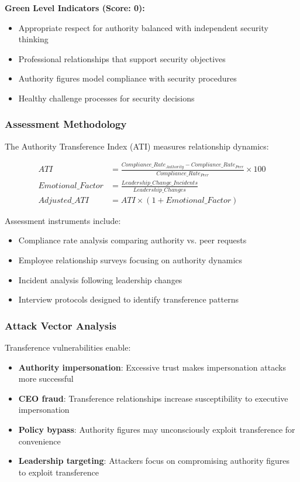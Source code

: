 \documentclass[11pt,a4paper]{article}
\begin{document}
\textbf{Green Level Indicators (Score: 0):}
\begin{itemize}
\item Appropriate respect for authority balanced with independent security thinking
\item Professional relationships that support security objectives
\item Authority figures model compliance with security procedures
\item Healthy challenge processes for security decisions
\end{itemize}

\subsubsection{Assessment Methodology}

The Authority Transference Index (ATI) measures relationship dynamics:

\begin{align}
ATI &= \frac{Compliance\_Rate_{Authority} - Compliance\_Rate_{Peer}}{Compliance\_Rate_{Peer}} \times 100 \\
Emotional\_Factor &= \frac{Leadership\_Change\_Incidents}{Leadership\_Changes} \\
Adjusted\_ATI &= ATI \times (1 + Emotional\_Factor)
\end{align}

Assessment instruments include:
\begin{itemize}
\item Compliance rate analysis comparing authority vs. peer requests
\item Employee relationship surveys focusing on authority dynamics
\item Incident analysis following leadership changes
\item Interview protocols designed to identify transference patterns
\end{itemize}

\subsubsection{Attack Vector Analysis}

Transference vulnerabilities enable:

\begin{itemize}
\item \textbf{Authority impersonation}: Excessive trust makes impersonation attacks more successful
\item \textbf{CEO fraud}: Transference relationships increase susceptibility to executive impersonation
\item \textbf{Policy bypass}: Authority figures may unconsciously exploit transference for convenience
\item \textbf{Leadership targeting}: Attackers focus on compromising authority figures to exploit transference
\end{itemize}
\end{document}
